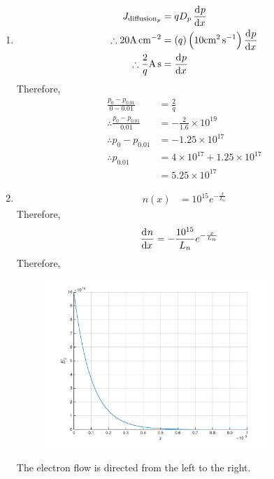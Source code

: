\documentclass[fleqn, a4paper, 11pt, oneside]{amsart}
\theoremstyle{definition}
\theoremstyle{theorem}
\begin{document}
\begin{solution}
	\begin{enumerate}[leftmargin=*]
		\item
			\begin{align*}
				J_{\text{diffusion}_p} &= q D_p \dod{p}{x}\\
				\therefore 20 \si{\ampere\per\centi\metre\squared} &= (q) \left( 10 \si{\centi\metre\squared\per\second} \right) \dod{p}{x}\\
				\therefore \frac{2}{q} \si{\ampere\second} &= \dod{p}{x}
			\end{align*}
			Therefore,
			\begin{align*}
				\frac{p_0 - p_{0.01}}{0 - 0.01} &= \frac{2}{q}\\
				\therefore \frac{p_0 - p_{0.01}}{0.01} &= -\frac{2}{1.6} \times 10^{19}\\
				\therefore p_0 - p_{0.01} &= -1.25 \times 10^{17}\\
				\therefore p_{0.01} &= 4 \times 10^{17} + 1.25 \times 10^{17}\\
				&= 5.25 \times 10^{17}
			\end{align*}
		\item
			\begin{align*}
				n(x) &= 10^{15} e^{-\frac{x}{L_n}}
			\end{align*}
			Therefore,
			\begin{align*}
				\dod{n}{x} &= -\frac{10^{15}}{L_n} e^{-\frac{x}{L_n}}
			\end{align*}
			Therefore,
			\begin{figure}[H]
				\centering
				\includegraphics[width = 0.8\textwidth]{plot2.pdf}
			\end{figure}
			The electron flow is directed from the left to the right.\\

\end{enumerate}
\end{solution}
\end{document}
